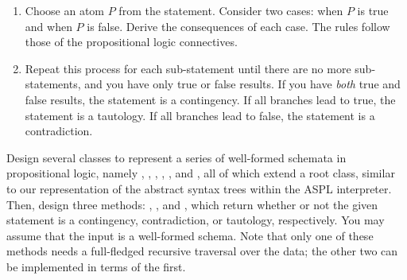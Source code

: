 
\begin{enumerate}
    \item Choose an atom $P$ from the statement. Consider two cases: when $P$ is true and when $P$ is false. Derive the consequences of each case. The rules follow those of the propositional logic connectives.
    \item Repeat this process for each sub-statement until there are no more sub-statements, and you have only true or false results. If you have \textit{both} true and false results, the statement is a contingency. If all branches lead to true, the statement is a tautology. If all branches lead to false, the statement is a contradiction. 
\end{enumerate}

Design several classes to represent a series of well-formed schemata in propositional logic, namely , , , , , and , all of which extend a root  class, similar to our representation of the abstract syntax trees within the ASPL interpreter. Then, design three methods: , , and , which return whether or not the given statement is a contingency, contradiction, or tautology, respectively. You may assume that the input is a well-formed schema. Note that only one of these methods needs a full-fledged recursive traversal over the data; the other two can be implemented in terms of the first.